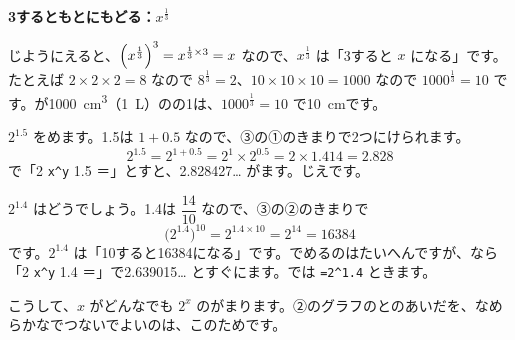 \begin{motto}[3]
\par\addvspace{3pt}\textbf{3するともとにもどる：$x^{\frac{1}{3}}$}\par\noindent
{}じようにえると、$\Bigl(x^{\frac{1}{3}}\Bigr)^3=x^{\frac{1}{3}\times3}=x$ なので、$x^{\frac{1}{3}}$ は「3すると $x$ になる」です。たとえば $2\times2\times2=8$ なので $8^{\frac{1}{3}}=2$、$10\times10\times10=1000$ なので $1000^{\frac{1}{3}}=10$ です。が\qty{1000}{cm^3}（\qty{1}{L}）のの1は、$1000^{\frac{1}{3}}=10$ で\qty{10}{cm}です。
\end{motto}


\leavevmode\label{bk:3-11:dentaku}$2^{1.5}$ をめます。1.5は $1+0.5$ なので、③の①のきまりで2つにけられます。
\[ 2^{1.5}=2^{1+0.5}=2^1\times2^{0.5}=2\times1.414=2.828 \]
で「2 \texttt{x\^{}y} 1.5 ＝」とすと、2.828427… がます。じえです。

\noindent\begin{minipage}[c]{0.66\linewidth}
$2^{1.4}$ はどうでしょう。1.4は $\dfrac{14}{10}$ なので、③の②のきまりで
\[ \bigl(2^{1.4}\bigr)^{10}=2^{1.4\times10}=2^{14}=16384 \]
です。$2^{1.4}$ は「10すると16384になる」です。でめるのはたいへんですが、なら「2 \texttt{x\^{}y} 1.4 ＝」で2.639015… とすぐにます。では \texttt{=2\^{}1.4} ときます。
\end{minipage}\hfill
\begin{minipage}[c]{0.3\linewidth}\centering
{}
\end{minipage}

\par\vspace{4pt}
こうして、$x$ がどんなでも $2^x$ のがまります。②のグラフのとのあいだを、なめらかなでつないでよいのは、このためです。

